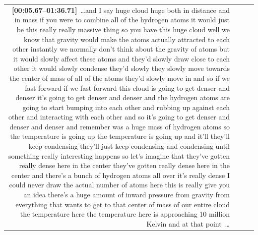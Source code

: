 \documentclass[10pt]{article}
\begin{document}
\begin{tiny}
\begin{longtable}{r p{0.3in} p{1.212in} p{3.8in}}
                                                                                                                                                                                                                                                                                         \textbf{[00:05.67--01:36.71]}~\ldots and I say huge cloud huge both in distance and in mass if you were to combine all of the hydrogen atoms it would just be this really really massive thing so you have this huge cloud well we know that gravity would make the atoms actually attracted to each other instantly we normally don't think about the gravity of atoms but it would slowly affect these atoms and they'd slowly draw close to each other it would slowly condense they'd slowly they slowly move towards the center of mass of all of the atoms they'd slowly move in and so if we fast forward if we fast forward this cloud is going to get denser and denser it's going to get denser and denser and the hydrogen atoms are going to start bumping into each other and rubbing up against each other and interacting with each other and so it's going to get denser and denser and denser and remember was a huge mass of hydrogen atoms so the temperature is going up the temperature is going up and it'll they'll keep condensing they'll just keep condensing and condensing until something really interesting happens so let's imagine that they've gotten really dense here in the center they've gotten really dense here in the center and there's a bunch of hydrogen atoms all over it's really dense I could never draw the actual number of atoms here this is really give you an idea there's a huge amount of inward pressure from gravity from everything that wants to get to that center of mass of our entire cloud the temperature here the temperature here is approaching 10 million Kelvin and at that point~\ldots \\

\end{longtable}
\end{tiny}
\end{document}
